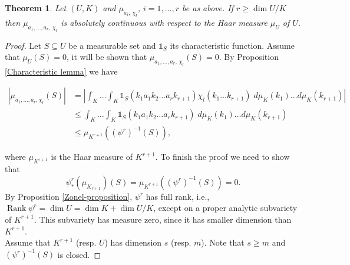 \documentclass[11pt,a4paper]{amsart}
\DeclareMathOperator{\rank}{\text{Rank}}
\newtheorem{theorem}{Theorem}[section]
\theoremstyle{definition}
\numberwithin{equation}{section}
\begin{document}
\begin{theorem} \label{Rgozin Theorem}
Let $(U,K)$ and  $\mu_{a_i, \, \chi_l}$, $i=1,\dots , r$ be as above. If $r \geq \dim U /K$ then $ \mu _{a_1, \dots , a_r, \, \chi_l}$ is absolutely continuous with respect to the Haar measure $\mu_U$ of  $U$. 
\end{theorem} 
\begin{proof}
 Let $S\subseteq U$ be a measurable set and $ {\mathds{1}}_S$ its characteristic function. Assume that $ \mu_U(S)=0$, it will be shown that $ \mu _{a_1, \dots , a_r, \, \chi_l}(S)=0$. By Proposition \ref{Characteristic lemma} we have \begin{small}
 \begin{align*}
\left\vert \mu _{a_1, \dots , a_r, \chi_l}(S) \right\vert & =\left\vert\int _K\dots\int_K  {\mathds{1}}_S( k_1a_1k_2\dots a_rk_{r+1}) \chi_l (k_1\dots k_{r+1})\;d\mu_K(k_1)\dots d\mu_K(k_{r+1})\right\vert \\
& \leq \int _K\dots\int_K  {\mathds{1}}_S( k_1a_1k_2\dots a_rk_{r+1}) \;d\mu_K(k_1)\dots d\mu_K(k_{r+1})\\
&\leq \mu_{K^{r+1}}({(\psi^r)}^ {-1}(S)),
\end{align*}
 \end{small} where $\mu_{K^{r+1}}$ is the Haar measure of $K^{r+1}$.
To finish the proof we need to show that  
$$
\psi^r_{*}\left(\mu_{K_{r+1}} \right) \left( S\right)= \mu_{K^{r+1}}({(\psi^r)}^ {-1}(S))=0.
$$
By  Proposition \ref{Zonel-proposition},  $ \psi^r$ has full rank, i.e., $\rank \psi^r = \dim U = \dim K + \dim U/K$,  except on a proper analytic subvariety of $K^{r+1}$. This subvariety has measure zero, since it has smaller dimension than $K^{r+1}$. \\
Assume that $K^{r+1} $ (resp. $ U$) has dimension $s$ (resp. $ m$).  Note that $s\geq m$ and $ (\psi^r)^{-1} (S)$ is closed.


\end{proof}
\end{document}
